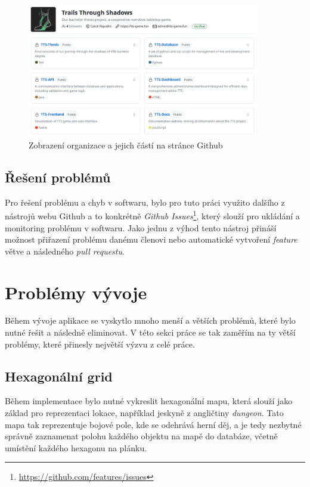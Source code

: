 \begin{figure}[H]
    \centering
    \includegraphics[width=0.9\textwidth]{../../shared/figures/gitOrg}
    \caption{Zobrazení organizace a jejich částí na stránce Github}
    \label{fig:git_organization}
\end{figure}

\subsection{Řešení problémů}
\label{subsec:implementation-collaboration-problems}
Pro řešení problému a chyb v softwaru, bylo pro tuto práci využito dalšího z nástrojů webu Github a to konkrétně \textit{Github Issues}\footnote{\href{https://github.com/features/issues}{https://github.com/features/issues}}, který slouží pro ukládání a monitoring problému v softwaru. Jako jednu z výhod tento nástroj přináší možnost přiřazení problému danému členovi nebo automatické vytvoření \textit{feature} větve a následného \textit{pull requestu}.

\section{Problémy vývoje}
\label{sec:implementation-problems}
Během vývoje aplikace se vyskytlo mnoho menší a větších problémů, které bylo nutné řešit a následně eliminovat. V této sekci práce se tak zaměřím na ty větší problémy, které přinesly největší výzvu z celé práce.

\subsection*{Hexagonální grid}
\label{subsec:implementation-problems-hexagon}
Během implementace bylo nutné vykreslit hexagonální mapu, která slouží jako základ pro reprezentaci lokace, například jeskyně z angličtiny \textit{dungeon}. Tato mapa tak reprezentuje bojové pole, kde se odehrává herní děj, a je tedy nezbytné správně zaznamenat polohu každého objektu na mapě do databáze, včetně umístění každého hexagonu na plánku.

